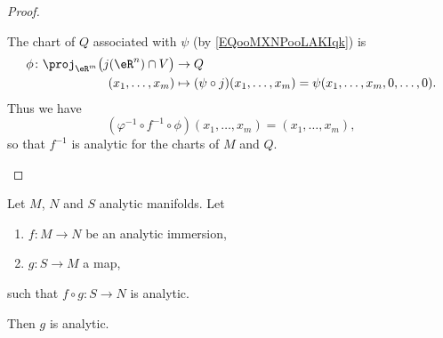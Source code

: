 \begin{proof}
\begin{subproof}
		\spitem[\( f^{-1}\) is analytic]
		The chart of \( Q\) associated with \( \psi\) (by \eqref{EQooMXNPooLAKIqk}) is
		\begin{equation}
			\begin{aligned}
				\phi\colon \proj_{\eR^m}\big( j(\eR^n)\cap V \big) & \to Q                                                                  \\
				(x_1,\ldots,x_m)                                   & \mapsto (\psi\circ j)(x_1,\ldots,x_m)=\psi(x_1,\ldots,x_m,0,\ldots,0).
			\end{aligned}
		\end{equation}
		Thus we have
		\begin{equation}
			(\varphi^{-1}\circ f^{-1}\circ\phi)(x_1,\ldots,x_m)=(x_1,\ldots,x_m),
		\end{equation}
		so that \( f^{-1}\) is analytic for the charts of \( M\) and \( Q\).
	\end{subproof}
\end{proof}

\begin{proposition}	\label{PROPooSKXGooQlZdGZ}
	Let \( M\), \( N\) and \( S\) analytic manifolds. Let
	\begin{enumerate}
		\item
		      \(f \colon M\to N  \) be an analytic immersion,
		\item
		      \(g \colon S\to M  \) a map,
	\end{enumerate}
	such that \(f\circ g \colon S\to N  \) is analytic.

	Then \( g\) is analytic.
\end{proposition}

